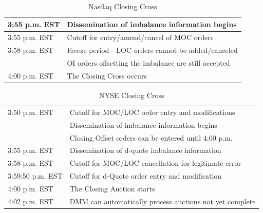 	\begin{table}[!ht]
   	\centering
   	\caption{Nasdaq Closing Cross\label{tab:NASDAQclose}}
   	\begin{tabular}{ll} 
	3:55 p.m. EST & Dissemination of imbalance information begins  \\ \hline
	3:55 p.m. EST & Cutoff for entry/amend/cancel of MOC orders\\ \hline
	3:58 p.m. EST & Freeze period - LOC orders cannot be added/canceled  \\ 
	 & OI orders offsetting the imbalance are still accepted   \\ \hline	
	4:00 p.m. EST & The Closing Cross occurs		
  	 \end{tabular}
	\end{table}	


	\begin{table}[!ht]
   	\centering
   	\caption{NYSE Closing Cross\label{tab:NYSEclose}}
   	\begin{tabular}{ll} 
	3:50 p.m. EST & Cutoff for MOC/LOC order entry and modifications  \\ 
     	& Dissemination of imbalance information begins \\
	& Closing Offset orders can be entered until 4:00 p.m.  \\ \hline	 
	3:55 p.m. EST &  Dissemination of d-quote imbalance information\\ \hline
	3:58 p.m. EST & Cutoff for MOC/LOC cancellation for legitimate error \\ \hline
	3:59:50 p.m. EST & Cutoff for d-Quote order entry and modification \\ \hline
	4:00 p.m. EST & The Closing Auction starts \\ \hline
	4:02 p.m. EST & DMM can automatically process auctions not yet complete
   	\end{tabular}
	\end{table}	


